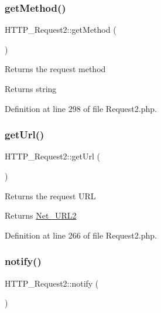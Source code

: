 \subsubsection{\texorpdfstring{get\+Method()}{getMethod()}}
{\footnotesize\ttfamily H\+T\+T\+P\+\_\+\+Request2\+::get\+Method (\begin{DoxyParamCaption}{ }\end{DoxyParamCaption})}

Returns the request method

\begin{DoxyReturn}{Returns}
string 
\end{DoxyReturn}


Definition at line 298 of file Request2.\+php.

\mbox{\label{classHTTP__Request2_a35d9ef6e266d90ad52a5037b70850694}} 
\subsubsection{\texorpdfstring{get\+Url()}{getUrl()}}
{\footnotesize\ttfamily H\+T\+T\+P\+\_\+\+Request2\+::get\+Url (\begin{DoxyParamCaption}{ }\end{DoxyParamCaption})}

Returns the request U\+RL

\begin{DoxyReturn}{Returns}
\hyperlink{classNet__URL2}{Net\+\_\+\+U\+R\+L2} 
\end{DoxyReturn}


Definition at line 266 of file Request2.\+php.

\mbox{\label{classHTTP__Request2_af35a8a6eb99219760dddd6223599a8ef}} 
\subsubsection{\texorpdfstring{notify()}{notify()}}
{\footnotesize\ttfamily H\+T\+T\+P\+\_\+\+Request2\+::notify (\begin{DoxyParamCaption}{ }\end{DoxyParamCaption})}

